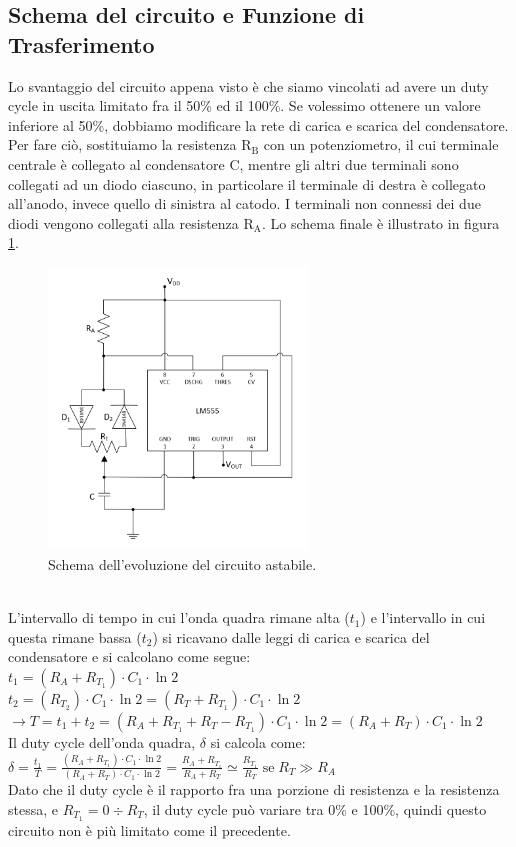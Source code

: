 \documentclass{report}
\begin{document}
\subsection{Schema del circuito e Funzione di Trasferimento}
Lo svantaggio del circuito appena visto è che siamo vincolati ad avere un duty cycle in uscita limitato fra il 50\% ed il 100\%. Se volessimo ottenere un valore inferiore al 50\%, dobbiamo modificare la rete di carica e scarica del condensatore. Per fare ciò, sostituiamo la resistenza $\mathrm{R_B}$ con un potenziometro, il cui terminale centrale è collegato al condensatore C, mentre gli altri due terminali sono collegati ad un diodo ciascuno, in particolare il terminale di destra è collegato all'anodo, invece quello di sinistra al catodo. I terminali non connessi dei due diodi vengono collegati alla resistenza $\mathrm{R_A}$. Lo schema finale è illustrato in figura \ref{figura:schema4}.
\begin{figure}[h!]
	\centering
	\includegraphics[height=7.5cm]{immagini/schema4}
	\caption{Schema dell'evoluzione del circuito astabile.}
	\label{figura:schema4}
\end{figure}
\\L'intervallo di tempo in cui l'onda quadra rimane alta ($t_1$) e l'intervallo in cui questa rimane bassa ($t_2$) si ricavano dalle leggi di carica e scarica del condensatore e si calcolano come segue:
\\[4pt]\indent$\displaystyle{t_1 = (R_A+R_{T_1})\cdot C_1\cdot \ln2}$
\\[4pt]\indent$\displaystyle{t_2 = (R_{T_2})\cdot C_1\cdot \ln2 = (R_T+R_{T_1})\cdot C_1\cdot \ln2}$
\\[4pt]\indent$\displaystyle{\rightarrow T=t_1+t_2=(R_A+R_{T_1}+R_T-R_{T_1})\cdot C_1\cdot \ln2 = (R_A+R_T)\cdot C_1\cdot \ln2}$
\\[4pt]Il duty cycle dell'onda quadra, $\delta$ si calcola come:
\\[4pt]\indent$\displaystyle{\delta=\frac{t_1}{T}=\frac{(R_A+R_{T_1})\cdot C_1\cdot \ln2}{(R_A+R_T)\cdot C_1\cdot \ln2}=\frac{R_A+R_{T_1}}{R_A+R_T}\simeq\frac{R_{T_1}}{R_T}\mathrm{\; se \;}R_{T}\gg R_A}$
\\[4pt]Dato che il duty cycle è il rapporto fra una porzione di resistenza e la resistenza stessa, e $\displaystyle{R_{T_1} = 0\div R_T}$, il duty cycle può variare tra 0\% e 100\%, quindi questo circuito non è più limitato come il precedente.
\end{document}
